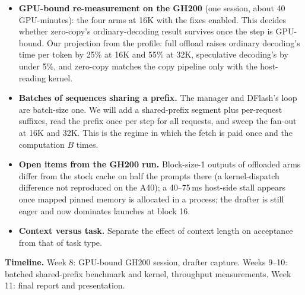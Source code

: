 \documentclass{article}
\begin{document}
\begin{itemize}
\item \textbf{GPU-bound re-measurement on the GH200} (one session, about 40 GPU-minutes): the four arms at 16K with the fixes enabled. This decides whether zero-copy's ordinary-decoding result survives once the step is GPU-bound. Our projection from the profile: full offload raises ordinary decoding's time per token by 25\% at 16K and 55\% at 32K, speculative decoding's by under 5\%, and zero-copy matches the copy pipeline only with the host-reading kernel.
\item \textbf{Batches of sequences sharing a prefix.} The manager and DFlash's loop are batch-size one. We will add a shared-prefix segment plus per-request suffixes, read the prefix once per step for all requests, and sweep the fan-out at 16K and 32K. This is the regime in which the fetch is paid once and the computation $B$ times.
\item \textbf{Open items from the GH200 run.} Block-size-1 outputs of offloaded arms differ from the stock cache on half the prompts there (a kernel-dispatch difference not reproduced on the A40); a 40--75\,ms host-side stall appears once mapped pinned memory is allocated in a process; the drafter is still eager and now dominates launches at block 16.
\item \textbf{Context versus task.} Separate the effect of context length on acceptance from that of task type.
\end{itemize}

\textbf{Timeline.}
Week 8: GPU-bound GH200 session, drafter capture. Weeks 9--10: batched shared-prefix benchmark and kernel, throughput measurements. Week 11: final report and presentation.

\FloatBarrier


\end{document}
